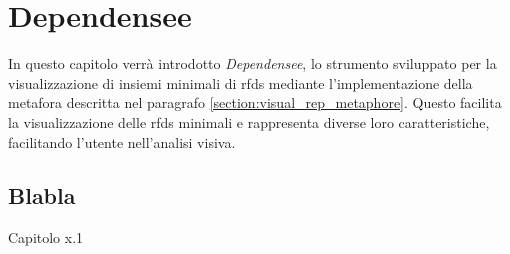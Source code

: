 \chapter{Dependensee}
\label{cap5:dependensee}
In questo capitolo verr\`{a} introdotto \textit{Dependensee}, lo strumento sviluppato per la visualizzazione di insiemi minimali di \acrfull{rfds} mediante l'implementazione della metafora descritta nel paragrafo \ref{section:visual_rep_metaphore}. Questo facilita la visualizzazione delle \acrfull{rfds} minimali e rappresenta diverse loro caratteristiche, facilitando l'utente nell'analisi visiva.

\section{Blabla} %
Capitolo x.1